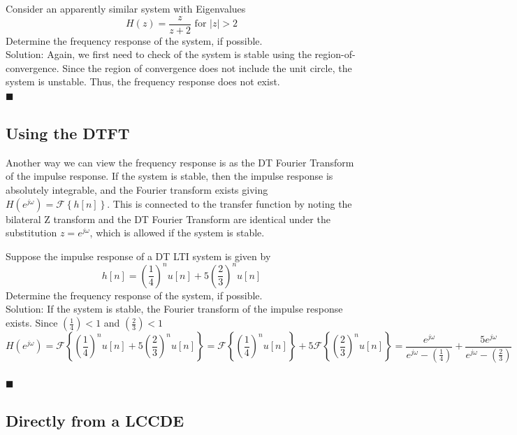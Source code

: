\begin{example} Consider an apparently similar system with Eigenvalues
  \[
  H(z) = \frac{z}{z+2}\mbox{ for } |z| > 2
  \]
  Determine the frequency response of the system, if possible.\\

  Solution: Again, we first need to check of the system is stable using the region-of-convergence. Since the region of convergence does not include the unit circle, the system is unstable. Thus, the frequency response does not exist.
\\$\blacksquare$
\end{example}

\subsection*{Using the DTFT}

Another way we can view the frequency response is as the DT Fourier Transform of the impulse response. If the system is stable, then the impulse response is absolutely integrable, and the Fourier transform exists giving $H\left(e^{j\omega}\right) = \mathcal{F}\left\{h[n]\right\}$. This is connected to the transfer function by noting the bilateral Z transform and the DT Fourier Transform are identical under the substitution $z = e^{j\omega}$, which is allowed if the system is stable.

\begin{example} Suppose the impulse response of a DT LTI system is given by
  \[
  h[n] = \left(\frac{1}{4}\right)^n u[n] + 5\left(\frac{2}{3}\right)^n u[n] 
  \]
  Determine the frequency response of the system, if possible.\\

  Solution: If the system is stable, the Fourier transform of the impulse response exists. Since $\left(\frac{1}{4}\right) < 1$ and $\left(\frac{2}{3}\right) < 1$
  \[
H\left(e^{j\omega}\right) = \mathcal{F}\left\{ \left(\frac{1}{4}\right)^n u[n] + 5\left(\frac{2}{3}\right)^n u[n] \right\} = \mathcal{F}\left\{ \left(\frac{1}{4}\right)^n u[n]\right\} + 5 \mathcal{F}\left\{ \left(\frac{2}{3}\right)^n u[n] \right\} = \frac{e^{j\omega}}{e^{j\omega} - \left(\frac{1}{4}\right)} + \frac{5e^{j\omega}}{e^{j\omega} - \left(\frac{2}{3}\right)} 
\]\\
$\blacksquare$
\end{example}

\subsection*{Directly from a LCCDE}

